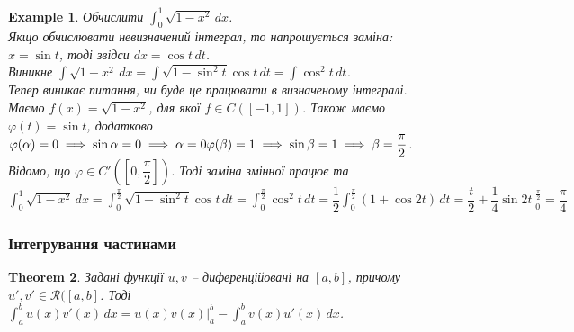 \documentclass[a4paper, 10pt]{article}
\makeatletter
\def\huge{\displaystyle}
\def\qed{$\blacksquare$}
\theoremstyle{theoremdd}
\newtheorem{theorem}{Theorem}[subsection]
\theoremstyle{theoremdd}
\theoremstyle{theoremdd}
\theoremstyle{theoremdd}
\theoremstyle{theoremdd}
\newtheorem{example}[theorem]{Example}
\theoremstyle{theoremdd}
\theoremstyle{theoremdd}
\theoremstyle{theoremdd}
\theoremstyle{theoremdd}
\renewenvironment{proof}[1][Proof.\\]{\par
\pushQED{\hfill \qed}%
\normalfont \topsep6\p@\@plus6\p@\relax
\trivlist
\item\relax
{\bfseries
#1\@addpunct{.}}\hspace\labelsep\ignorespaces
}{%
\popQED\endtrivlist\@endpefalse
}
\makeatother
\begin{document}
\iffalse
\begin{proof}
Оскільки $f \in C((A,B))$, то також $f \in C(\varphi([\alpha,\beta]))$ (зауважу, що $\varphi([a,b])$ - це також відрізок), тоді $f$ неперервна на відрізку з кінцями $\varphi(\alpha),\varphi(\beta)$, а тому вона має первісну $G$. За формулою Ньютона-Ляйбніца:\\
$\huge\int_{\varphi(\alpha)}^{\varphi(\beta)} f(x)\,dx = G(\varphi(\beta)) - G(\varphi(\alpha))$.\\
За умовою, маємо $f \circ \varphi \cdot \varphi' \in C([\alpha,\beta])$. А також зауважимо, що $G$ - первісна для функції $f \circ \varphi \cdot \varphi'$, тому що $G'(\varphi(x)) = f(\varphi(x)) \varphi'(x)$. За формулою Ньютона-Ляйбніца:\\
$\huge\int_\alpha^\beta f(\varphi(x))\varphi'(x)\,dx = G(\varphi(b)) - G(\varphi(a))$.\\
Отже, $\huge\int_\alpha^\beta f(\varphi(x))\varphi'(x)\,dx = \int_{\varphi(\alpha)}^{\varphi(\beta)} f(x)\,dx$.
\end{proof}
\fi

\begin{example}
Обчислити $\huge\int_0^1 \sqrt{1-x^2}\,dx$.\\
Якщо обчислювати невизначений інтеграл, то напрошується заміна: \\
$x = \sin t$, тоді звідси $dx = \cos t \,dt$.\\
Виникне $\huge\int \sqrt{1-x^2}\,dx = \int \sqrt{1-\sin^2 t} \cos t\,dt = \int \cos^2 t\,dt$.\\
Тепер виникає питання, чи буде це працювати в визначеному інтегралі.\\
Маємо $f(x) = \sqrt{1-x^2}$, для якої $f \in C([-1,1])$. Також маємо $\varphi(t) = \sin t$, додатково \\
$\varphi(\alpha) = 0 \implies \sin \alpha = 0 \implies \alpha = 0 \\
\varphi(\beta) = 1 \implies \sin \beta = 1 \implies \beta = \dfrac{\pi}{2}$.\\ Відомо, що $\varphi \in C'\left(\left[0,\dfrac{\pi}{2}\right]\right)$. Тоді заміна змінної працює та\\
$\huge\int_0^1 \sqrt{1-x^2}\,dx = \int_0^{\frac{\pi}{2}} \sqrt{1-\sin^2 t} \cos t \,dt = \int_0^{\frac{\pi}{2}} \cos^2 t\,dt = \dfrac{1}{2} \int_0^{\frac{\pi}{2}} (1+\cos 2t)\,dt = \dfrac{t}{2} + \dfrac{1}{4} \sin 2t \Big|_0^{\frac{\pi}{2}} = \dfrac{\pi}{4}$
\end{example}

\subsubsection{Інтегрування частинами}
\begin{theorem}
Задані функції $u,v$ -- диференційовані на $[a,b]$, причому $u',v' \in \mathcal{R}([a,b]$. Тоді \\
$\huge\int_a^b u(x)v'(x)\,dx = u(x)v(x) \Big|_a^b - \int_a^b v(x)u'(x)\,dx$.
\end{theorem}
\end{document}
